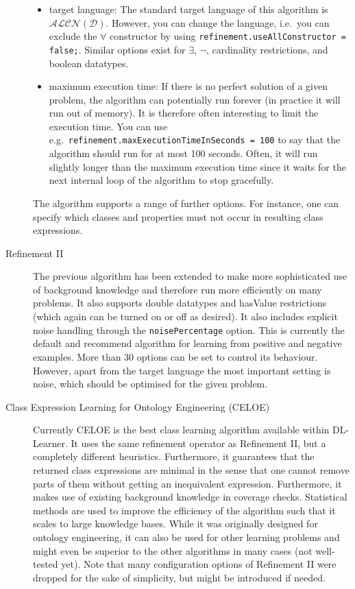 \documentclass[a4paper,12pt]{scrartcl}
\begin{document}
\begin{description}
\begin{itemize}
  \item target language: The standard target language of this algorithm is $\mathcal{ALCN(D)}$. However, you can change the language, i.e.~you can exclude the $\forall$ constructor by using \verb|refinement.useAllConstructor = false;|. Similar options exist for $\exists$, $\neg$, cardinality restrictions, and boolean datatypes.
  \item maximum execution time: If there is no perfect solution of a given problem, the algorithm can potentially run forever (in practice it will run out of memory). It is therefore often interesting to limit the execution time. You can use e.g.~\verb|refinement.maxExecutionTimeInSeconds = 100| to say that the algorithm should run for at most 100 seconds. Often, it will run slightly longer than the maximum execution time since it waits for the next internal loop of the algorithm to stop gracefully.
 \end{itemize}
  The algorithm supports a range of further options. For instance, one can specify which classes and properties must not occur in resulting class expressions.
 \item[Refinement II] The previous algorithm has been extended to make more sophisticated use of background knowledge and therefore run more efficiently on many problems. It also supports double datatypes and hasValue restrictions (which again can be turned on or off as desired). It also includes explicit noise handling through the \verb|noisePercentage| option. This is currently the default and recommend algorithm for learning from positive and negative examples. More than 30 options can be set to control its behaviour. However, apart from the target language the most important setting is noise, which should be optimised for the given problem.
 \item[Class Expression Learning for Ontology Engineering (CELOE)] Currently CELOE is the best class learning algorithm available within DL-Learner. It uses the same refinement operator as Refinement II, but a completely different heuristics. Furthermore, it guarantees that the returned class expressions are minimal in the sense that one cannot remove parts of them without getting an inequivalent expression. Furthermore, it makes use of existing background knowledge in coverage checks. Statistical methods are used to improve the efficiency of the algorithm such that it scales to large knowledge bases. While it was originally designed for ontology engineering, it can also be used for other learning problems and might even be superior to the other algorithms in many cases (not well-tested yet). Note that many configuration options of Refinement II were dropped for the sake of simplicity, but might be introduced if needed.
\end{description}
\end{document}
